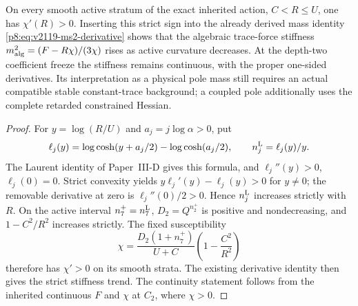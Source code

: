 \documentclass[12pt,a4paper]{article}
\begin{document}
\begin{corollary}
\label{p8:cor:v2202-strict-trace-stiffness}
On every smooth active stratum of the exact inherited action,
$C<R\le U$, one has $\chi'(R)>0$.  Inserting this strict sign into the
already derived mass identity
\eqref{p8:eq:v2119-ms2-derivative} shows that the algebraic trace-force
stiffness $m_{\rm alg}^2=(F-R\chi)/(3\chi)$ rises as active curvature
decreases.  At the depth-two coefficient freeze the stiffness remains
continuous, with the proper one-sided derivatives.  Its interpretation
as a physical pole mass still requires an actual compatible stable
constant-trace background; a coupled pole additionally uses the complete
retarded constrained Hessian.
\end{corollary}
\begin{proof}
For $y=\log(R/U)$ and $a_j=j\log\alpha>0$, put
\[
 \ell_j(y)=\log\cosh(y+a_j/2)-\log\cosh(a_j/2),\qquad
 n_j^{\rm L}=\ell_j(y)/y.
\]
The Laurent identity of Paper~III-D gives this formula, and
$\ell_j''(y)>0$, $\ell_j(0)=0$.  Strict convexity yields
$y\ell_j'(y)-\ell_j(y)>0$ for $y\ne0$; the removable derivative at zero
is $\ell_j''(0)/2>0$.  Hence $n_j^{\rm L}$ increases strictly with $R$.
On the active interval $n_7^+=n_7^{\rm L}$, $D_2=Q^{n_2^+}$ is
positive and nondecreasing, and $1-C^2/R^2$ increases strictly.
The fixed susceptibility
\[
 \chi=\frac{D_2(1+n_7^+)}{U+C}
       \left(1-\frac{C^2}{R^2}\right)
\]
therefore has $\chi'>0$ on its smooth strata.  The existing derivative
identity then gives the strict stiffness trend.  The continuity statement
follows from the inherited
continuous $F$ and $\chi$ at $C_2$, where $\chi>0$.
\end{proof}
\end{document}
